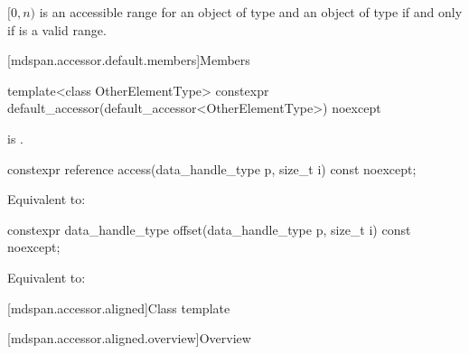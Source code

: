 \pnum
$[0, n)$ is an accessible range for
an object  of type  and
an object of type 
if and only if  is a valid range.

[mdspan.accessor.default.members]{Members}

%
\begin{itemdecl}
template<class OtherElementType>
  constexpr default_accessor(default_accessor<OtherElementType>) noexcept {}
\end{itemdecl}

\begin{itemdescr}
\pnum
\constraints
{}
is .
\end{itemdescr}

%
\begin{itemdecl}
constexpr reference access(data_handle_type p, size_t i) const noexcept;
\end{itemdecl}

\begin{itemdescr}
\pnum
\effects
Equivalent to: 
\end{itemdescr}

%
\begin{itemdecl}
constexpr data_handle_type offset(data_handle_type p, size_t i) const noexcept;
\end{itemdecl}

\begin{itemdescr}
\pnum
\effects
Equivalent to: 
\end{itemdescr}

[mdspan.accessor.aligned]{Class template }

[mdspan.accessor.aligned.overview]{Overview}

